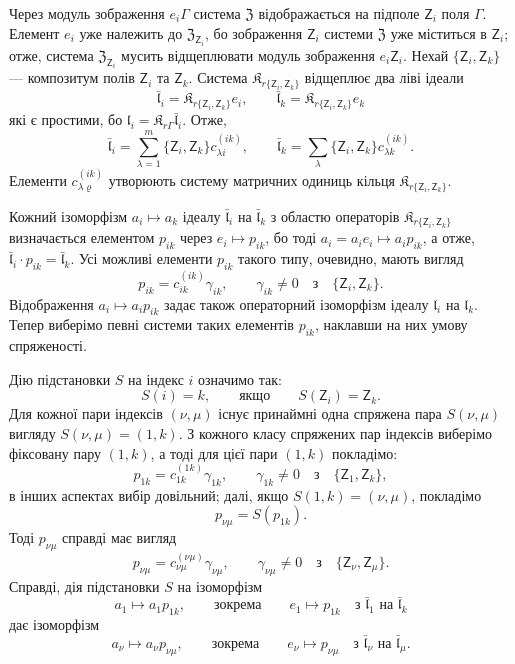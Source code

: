 \documentclass[11pt]{article}
\begin{document}
Через модуль зображення \(e_i\Gamma\) система \(\mathfrak Z\) відображається на підполе \(\mathsf{Z}_i\) поля \(\Gamma\). Елемент \(e_i\) уже належить до \(\mathfrak Z_{\mathsf{Z}_i}\), бо зображення \(\mathsf{Z}_i\) системи \(\mathfrak Z\) уже міститься в \(\mathsf{Z}_i\); отже, система \(\mathfrak Z_{\mathsf{Z}_i}\) мусить відщеплювати модуль зображення \(e_i\mathsf{Z}_i\). Нехай \(\{\mathsf{Z}_i,\mathsf{Z}_k\}\) --- композитум полів \(\mathsf{Z}_i\) та \(\mathsf{Z}_k\). Система \(\mathfrak K_{r\{\mathsf{Z}_i,\mathsf{Z}_k\}}\) відщеплює два ліві ідеали
\[
\bar{\mathfrak l}_i=\mathfrak K_{r\{\mathsf{Z}_i,\mathsf{Z}_k\}}e_i,\qquad
\bar{\mathfrak l}_k=\mathfrak K_{r\{\mathsf{Z}_i,\mathsf{Z}_k\}}e_k
\]
які є простими, бо \(\mathfrak l_i=\mathfrak K_{r\Gamma}\bar{\mathfrak l}_i\). Отже,
\[
\bar{\mathfrak l}_i=\sum_{\lambda=1}^m\{\mathsf{Z}_i,\mathsf{Z}_k\}c_{\lambda i}^{(ik)},\qquad
\bar{\mathfrak l}_k=\sum_{\lambda}\{\mathsf{Z}_i,\mathsf{Z}_k\}c_{\lambda k}^{(ik)}.
\]
Елементи \(c_{\lambda\varrho}^{(ik)}\) утворюють систему матричних одиниць кільця \(\mathfrak K_{r\{\mathsf{Z}_i,\mathsf{Z}_k\}}\).

Кожний ізоморфізм \(a_i\mapsto a_k\) ідеалу \(\bar{\mathfrak l}_i\) на \(\bar{\mathfrak l}_k\) з областю операторів \(\mathfrak K_{r\{\mathsf{Z}_i,\mathsf{Z}_k\}}\) визначається елементом \(p_{ik}\) через \(e_i\mapsto p_{ik}\), бо тоді \(a_i=a_ie_i\mapsto a_ip_{ik}\), а отже, \(\bar{\mathfrak l}_i\cdot p_{ik}=\bar{\mathfrak l}_k\). Усі можливі елементи \(p_{ik}\) такого типу, очевидно, мають вигляд
\[
p_{ik}=c_{ik}^{(ik)}\gamma_{ik},\qquad \gamma_{ik}\ne0\quad\text{з}\quad \{\mathsf{Z}_i,\mathsf{Z}_k\}.
\]
Відображення \(a_i\mapsto a_ip_{ik}\) задає також операторний ізоморфізм ідеалу \(\mathfrak l_i\) на \(\mathfrak l_k\). Тепер виберімо певні системи таких елементів \(p_{ik}\), наклавши на них умову спряженості.

Дію підстановки \(S\) на індекс \(i\) означимо так:
\[
S(i)=k,\qquad\text{якщо}\qquad S(\mathsf{Z}_i)=\mathsf{Z}_k.
\]
Для кожної пари індексів \((\nu,\mu)\) існує принаймні одна спряжена пара \(S(\nu,\mu)\) вигляду \(S(\nu,\mu)=(1,k)\). З кожного класу спряжених пар індексів виберімо фіксовану пару \((1,k)\), а тоді для цієї пари \((1,k)\) покладімо:
\[
p_{1k}=c_{1k}^{(1k)}\gamma_{1k},\qquad \gamma_{1k}\ne0\quad\text{з}\quad \{\mathsf{Z}_1,\mathsf{Z}_k\},
\]
в інших аспектах вибір довільний; далі, якщо \(S(1,k)=(\nu,\mu)\), покладімо
\[
p_{\nu\mu}=S(p_{1k}).
\]
Тоді \(p_{\nu\mu}\) справді має вигляд
\[
p_{\nu\mu}=c_{\nu\mu}^{(\nu\mu)}\gamma_{\nu\mu},\qquad
\gamma_{\nu\mu}\ne0\quad\text{з}\quad \{\mathsf{Z}_\nu,\mathsf{Z}_\mu\}.
\]
Справді, дія підстановки \(S\) на ізоморфізм
\[
a_1\mapsto a_1p_{1k},\qquad\text{зокрема}\qquad e_1\mapsto p_{1k}
\quad\text{з }\bar{\mathfrak l}_1\text{ на }\bar{\mathfrak l}_k
\]
дає ізоморфізм
\[
a_\nu\mapsto a_\nu p_{\nu\mu},\qquad\text{зокрема}\qquad e_\nu\mapsto p_{\nu\mu}
\quad\text{з }\bar{\mathfrak l}_\nu\text{ на }\bar{\mathfrak l}_\mu.
\]
\end{document}
